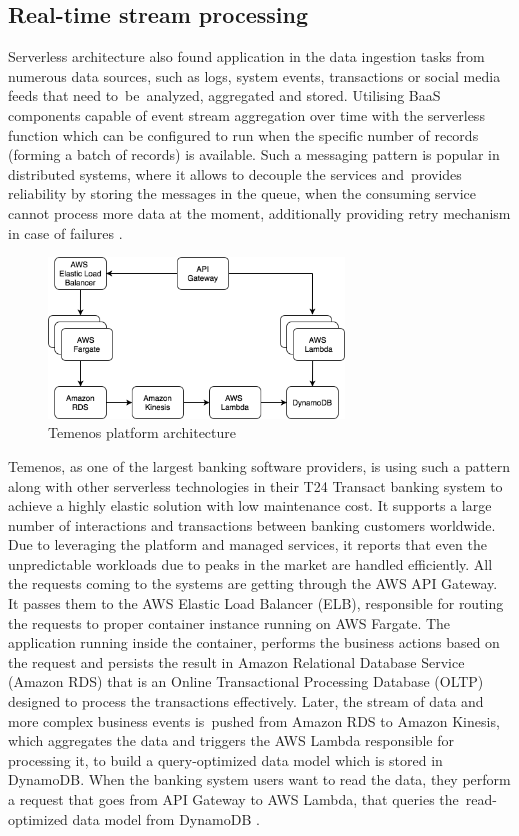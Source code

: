 \subsection{Real-time stream processing}

Serverless architecture also found application in the data ingestion tasks from numerous data sources, such as logs, system events, transactions or social media feeds that need to~be~analyzed, aggregated and stored. Utilising BaaS components capable of event stream aggregation over time with the serverless function which can be configured to run when the specific number of records (forming a batch of records) is available. Such a messaging pattern is popular in distributed systems, where it allows to decouple the services and~provides reliability by storing the messages in the queue, when the consuming service cannot process more data at the moment, additionally providing retry mechanism in case of failures \cite{ServerlessArchitectureOnAWS}.

\begin{figure}[h]
    \centering
    \includegraphics[width=0.7\textwidth]{assets/02-serverless/TemenosArchitecture.png}
    \caption{Temenos platform architecture}
    \label{fig:temenos-architecture-diagram}
\end{figure}

Temenos, as one of the largest banking software providers, is using such a pattern along with other serverless technologies in their T24 Transact banking system to achieve a highly elastic solution with low maintenance cost. It supports a large number of interactions and transactions between banking customers worldwide. Due to leveraging the platform and managed services, it reports that even the unpredictable workloads due to peaks in the market are handled efficiently. All the requests coming to the systems are getting through the AWS API Gateway. It passes them to the AWS Elastic Load Balancer (ELB), responsible for routing the requests to proper container instance running on AWS Fargate. The application running inside the container, performs the business actions based on the request and persists the result in Amazon Relational Database Service (Amazon RDS) that is an Online Transactional Processing Database (OLTP) designed to process the transactions effectively. Later, the stream of data and more complex business events is~pushed from Amazon RDS to Amazon Kinesis, which aggregates the data and triggers the AWS Lambda responsible for processing it, to build a query-optimized data model which is stored in DynamoDB. When the banking system users want to read the data, they perform a request that goes from API Gateway to AWS Lambda, that queries the~read-optimized data model from DynamoDB \cite{ThisIsMyAchitectureTemenos}.

